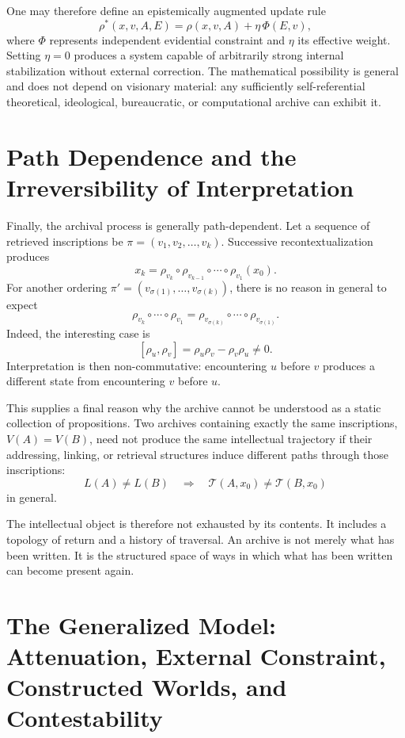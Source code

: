 \documentclass[11pt]{article}
\begin{document}
One may therefore define an epistemically augmented update rule
\[
\rho^\ast(x, v, A, E) = \rho(x, v, A) + \eta\, \Phi(E, v),
\]
where $\Phi$ represents independent evidential constraint and $\eta$ its effective weight. Setting $\eta = 0$ produces a system capable of arbitrarily strong internal stabilization without external correction. The mathematical possibility is general and does not depend on visionary material: any sufficiently self-referential theoretical, ideological, bureaucratic, or computational archive can exhibit it.

\section{Path Dependence and the Irreversibility of Interpretation}

Finally, the archival process is generally path-dependent. Let a sequence of retrieved inscriptions be $\pi = (v_1, v_2, \ldots, v_k)$. Successive recontextualization produces
\[
x_k = \rho_{v_k} \circ \rho_{v_{k-1}} \circ \cdots \circ \rho_{v_1}(x_0).
\]
For another ordering $\pi' = (v_{\sigma(1)}, \ldots, v_{\sigma(k)})$, there is no reason in general to expect
\[
\rho_{v_k} \circ \cdots \circ \rho_{v_1} = \rho_{v_{\sigma(k)}} \circ \cdots \circ \rho_{v_{\sigma(1)}}.
\]
Indeed, the interesting case is
\[
[\rho_u, \rho_v] = \rho_u \rho_v - \rho_v \rho_u \neq 0.
\]
Interpretation is then non-commutative: encountering $u$ before $v$ produces a different state from encountering $v$ before $u$.

This supplies a final reason why the archive cannot be understood as a static collection of propositions. Two archives containing exactly the same inscriptions, $V(A) = V(B)$, need not produce the same intellectual trajectory if their addressing, linking, or retrieval structures induce different paths through those inscriptions:
\[
L(A) \neq L(B) \quad \Longrightarrow \quad \mathcal{T}(A, x_0) \neq \mathcal{T}(B, x_0)
\]
in general.

The intellectual object is therefore not exhausted by its contents. It includes a topology of return and a history of traversal. An archive is not merely what has been written. It is the structured space of ways in which what has been written can become present again.

\section{The Generalized Model: Attenuation, External Constraint, Constructed Worlds, and Contestability}
\end{document}
